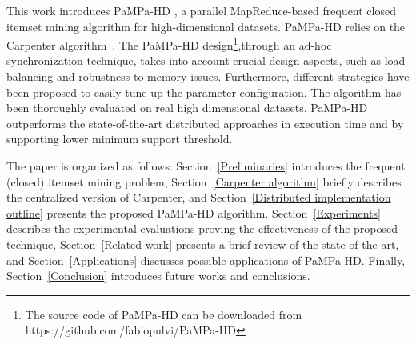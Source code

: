 This work introduces PaMPa-HD \cite{pampa_v1},
a parallel MapReduce-based frequent closed itemset mining algorithm
for high-dimensional datasets.
PaMPa-HD relies on the Carpenter algorithm~\cite{Zaki_Carpenter}. 
The PaMPa-HD design\footnote{The source code of PaMPa-HD can be downloaded from https://github.com/fabiopulvi/PaMPa-HD},through an ad-hoc synchronization technique, takes into account crucial design aspects,
such as load balancing and robustness to memory-issues. Furthermore, different strategies have been proposed to easily tune up the parameter configuration.
The algorithm has been thoroughly evaluated on real high dimensional datasets. 
PaMPa-HD outperforms the state-of-the-art distributed approaches
in execution time and by supporting lower minimum support threshold. 


The paper is organized as follows:
Section~\ref{Preliminaries} introduces the frequent (closed) itemset mining
problem,
Section~\ref{Carpenter algorithm} briefly describes the centralized version
of Carpenter,
and Section~\ref{Distributed implementation outline} presents the proposed
PaMPa-HD algorithm.
Section~\ref{Experiments} describes the experimental evaluations
proving the effectiveness of the proposed technique,
Section~\ref{Related work} presents a brief review of the state of the art,
and Section~\ref{Applications} discusses possible applications of PaMPa-HD.
Finally, Section~\ref{Conclusion} introduces future works and conclusions.


